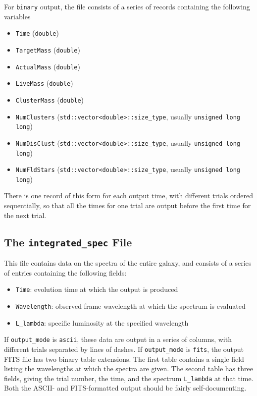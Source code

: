 \documentclass[12pt]{article}
\begin{document}
For \verb=binary= output, the file consists of a series of records containing the following variables
\begin{itemize}
\item \verb=Time= (\verb=double=)
\item \verb=TargetMass= (\verb=double=)
\item \verb=ActualMass= (\verb=double=)
\item \verb=LiveMass= (\verb=double=)
\item \verb=ClusterMass= (\verb=double=)
\item \verb=NumClusters= (\verb=std::vector<double>::size_type=, usually \verb=unsigned long long=)
\item \verb=NumDisClust= (\verb=std::vector<double>::size_type=, usually \verb=unsigned long long=)
\item \verb=NumFldStars= (\verb=std::vector<double>::size_type=, usually \verb=unsigned long long=)
\end{itemize}
There is one record of this form for each output time, with different trials ordered sequentially, so that all the times for one trial are output before the first time for the next trial.


\subsection{The \texttt{integrated\_spec} File}

This file contains data on the spectra of the entire galaxy, and consists of a series of entries containing the following fields:
\begin{itemize}
\item \verb=Time=: evolution time at which the output is produced
\item \verb=Wavelength=: observed frame wavelength at which the spectrum is evaluated
\item \verb=L_lambda=: specific luminosity at the specified wavelength
\end{itemize}

If \verb=output_mode= is \verb=ascii=, these data are output in a series of columns, with different trials separated by lines of dashes. If \verb=output_mode= is \verb=fits=, the output FITS file has two binary table extensions. The first table contains a single field listing the wavelengths at which the spectra are given. The second table has three fields, giving the trial number, the time, and the spectrum \verb=L_lambda= at that time. Both the ASCII- and FITS-formatted output should be fairly self-documenting.
\end{document}
